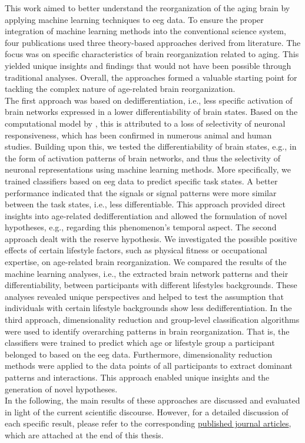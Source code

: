 This work aimed to better understand the reorganization of the aging brain by applying machine learning techniques to \gls{eeg} data. To ensure the proper integration of machine learning methods into the conventional science system, four publications used three theory-based approaches derived from literature. The focus was on specific characteristics of brain reorganization related to aging. This yielded unique insights and findings that would not have been possible through traditional analyses. Overall, the approaches formed a valuable starting point for tackling the complex nature of age-related brain reorganization.\\
The first approach was based on dedifferentiation, i.e., less specific activation of brain networks expressed in a lower differentiability of brain states. Based on the computational model by \citeauthor{Li2001} \cite{Li2001, Li2000}, this is attributed to a loss of selectivity of neuronal responsiveness, which has been confirmed in numerous animal and human studies. Building upon this, we tested the differentiability of brain states, e.g., in the form of activation patterns of brain networks, and thus the selectivity of neuronal representations using machine learning methods. More specifically, we trained classifiers based on \gls{eeg} data to predict specific task states. A better performance indicated that the signals or signal patterns were more similar between the task states, i.e., less differentiable. This approach provided direct insights into age-related dedifferentiation and allowed the formulation of novel hypotheses, e.g., regarding this phenomenon's temporal aspect. The second approach dealt with the reserve hypothesis. We investigated the possible positive effects of certain lifestyle factors, such as physical fitness or occupational expertise, on age-related brain reorganization. We compared the results of the machine learning analyses, i.e., the extracted brain network patterns and their differentiability, between participants with different lifestyles backgrounds. These analyses revealed unique perspectives and helped to test the assumption that individuals with certain lifestyle backgrounds show less dedifferentiation. In the third approach, dimensionality reduction and group-level classification algorithms were used to identify overarching patterns in brain reorganization. That is, the classifiers were trained to predict which age or lifestyle group a participant belonged to based on the \gls{eeg} data. Furthermore, dimensionality reduction methods were applied to the data points of all participants to extract dominant patterns and interactions. This approach enabled unique insights and the generation of novel hypotheses.\\
In the following, the main results of these approaches are discussed and evaluated in light of the current scientific discourse. However, for a detailed discussion of each specific result, please refer to the corresponding \hyperref[pub:papers]{published journal articles}, which are attached at the end of this thesis.

